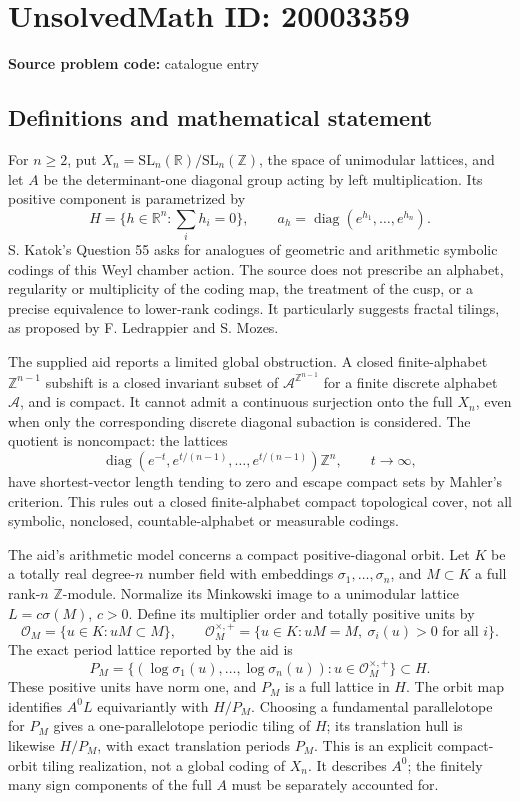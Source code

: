 \documentclass[11pt]{article}
\newcommand{\Z}{\mathbb{Z}}
\newcommand{\R}{\mathbb{R}}
\begin{document}
\section*{UnsolvedMath ID: 20003359}
\textbf{Source problem code:} catalogue entry
\subsection{Definitions and mathematical statement}
For $n\ge2$, put $X_n=\mathrm{SL}_n(\R)/\mathrm{SL}_n(\Z)$, the space of unimodular lattices, and let $A$ be the determinant-one diagonal group acting by left multiplication. Its positive component is parametrized by
\[
 H=\{h\in\R^n:\textstyle\sum_i h_i=0\},\qquad
 a_h=\operatorname{diag}(e^{h_1},\ldots,e^{h_n}).
\]
S. Katok's Question 55 asks for analogues of geometric and arithmetic symbolic codings of this Weyl chamber action. The source does not prescribe an alphabet, regularity or multiplicity of the coding map, the treatment of the cusp, or a precise equivalence to lower-rank codings. It particularly suggests fractal tilings, as proposed by F. Ledrappier and S. Mozes.

The supplied aid reports a limited global obstruction. A closed finite-alphabet $\Z^{n-1}$ subshift is a closed invariant subset of $\mathcal A^{\Z^{n-1}}$ for a finite discrete alphabet $\mathcal A$, and is compact. It cannot admit a continuous surjection onto the full $X_n$, even when only the corresponding discrete diagonal subaction is considered. The quotient is noncompact: the lattices
\[
 \operatorname{diag}(e^{-t},e^{t/(n-1)},\ldots,e^{t/(n-1)})\Z^n,
 \qquad t\to\infty,
\]
have shortest-vector length tending to zero and escape compact sets by Mahler's criterion. This rules out a closed finite-alphabet compact topological cover, not all symbolic, nonclosed, countable-alphabet or measurable codings.

The aid's arithmetic model concerns a compact positive-diagonal orbit. Let $K$ be a totally real degree-$n$ number field with embeddings $\sigma_1,\ldots,\sigma_n$, and $M\subset K$ a full rank-$n$ $\Z$-module. Normalize its Minkowski image to a unimodular lattice $L=c\sigma(M)$, $c>0$. Define its multiplier order and totally positive units by
\[
 \mathcal O_M=\{u\in K:uM\subset M\},\qquad
 \mathcal O_M^{\times,+}=\{u\in K:uM=M,\ \sigma_i(u)>0\text{ for all }i\}.
\]
The exact period lattice reported by the aid is
\[
 P_M=\{(\log\sigma_1(u),\ldots,\log\sigma_n(u)):
                      u\in\mathcal O_M^{\times,+}\}\subset H.
\]
These positive units have norm one, and $P_M$ is a full lattice in $H$. The orbit map identifies $A^0L$ equivariantly with $H/P_M$. Choosing a fundamental parallelotope for $P_M$ gives a one-parallelotope periodic tiling of $H$; its translation hull is likewise $H/P_M$, with exact translation periods $P_M$. This is an explicit compact-orbit tiling realization, not a global coding of $X_n$. It describes $A^0$; the finitely many sign components of the full $A$ must be separately accounted for.
\end{document}
